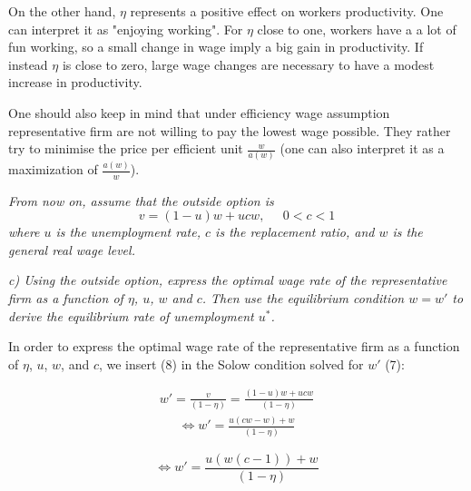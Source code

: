 \documentclass[11pt]{article} %
\begin{document}
On the other hand, $\eta$ represents a positive effect on workers productivity. One can interpret it as "enjoying working". For $\eta$ close to one, workers have a a lot of fun working, so a small change in wage imply a big gain in productivity. If instead $\eta$ is close to zero, large wage changes are necessary to have a modest increase in productivity. \par

One should also keep in mind that under efficiency wage assumption representative firm are not willing to pay the lowest wage possible. They rather try to minimise the price per efficient unit $\frac{w} {a(w)}$ (one can also interpret it as a maximization of $\frac{a(w)} {w}$).




\pagebreak
\textit{From now on, assume that the outside option is}
\begin{equation}
    v = (1-u)w+ucw, \;\;\;\;\; 0<c<1
\end{equation}
\textit{where $u$ is the unemployment rate, $c$ is the replacement ratio, and $w$ is the general real wage level.}



\bigskip
\textit{c) Using the outside option, express the optimal wage rate of the representative firm as a function of $\eta$, $u$, $w$ and $c$. Then use the equilibrium
condition $w=w'$ to derive the equilibrium rate of unemployment $u^*$.} \par

\bigskip
In order to express  the  optimal  wage  rate  of  the  representative  firm  as
a  function  of $\eta$, $u$, $w$, and $c$, we insert (8) in the Solow condition solved for $w'$ (7):

\begin{align*}
    w' = \frac{v} {(1 - \eta)} = \frac{(1-u)w+ucw} {(1 - \eta)}
\end{align*}
\begin{align*}
   \Longleftrightarrow w' = \frac{u\left(cw - w\right) + w} {(1 - \eta)}
\end{align*}

\begin{equation}
   \Longleftrightarrow w' = \frac{u\left(w(c-1)\right) + w} {(1 - \eta)}
\end{equation}
\end{document}
